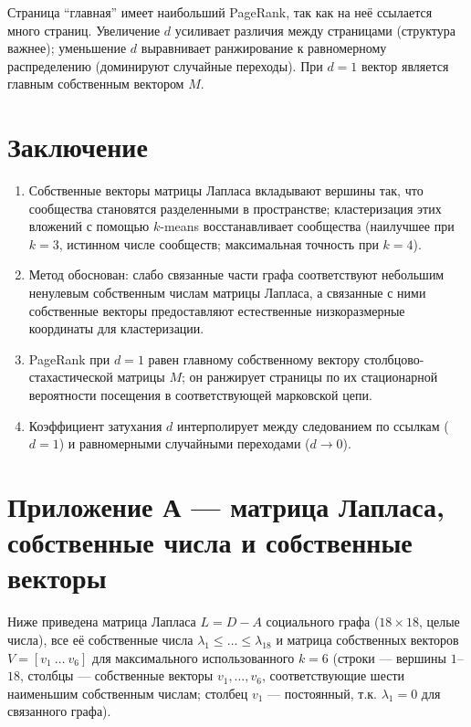 \documentclass[12pt,a4paper]{article}
\begin{document}
Страница ``главная'' имеет наибольший PageRank, так как на неё ссылается много страниц. Увеличение $d$ усиливает различия между страницами (структура важнее); уменьшение $d$ выравнивает ранжирование к равномерному распределению (доминируют случайные переходы). При $d=1$ вектор является главным собственным вектором $M$.

\section{Заключение}
\begin{enumerate}
    \item Собственные векторы матрицы Лапласа вкладывают вершины так, что сообщества становятся разделенными в пространстве; кластеризация этих вложений с помощью $k$-means восстанавливает сообщества (наилучшее при $k=3$, истинном числе сообществ; максимальная точность при $k=4$).
    \item Метод обоснован: слабо связанные части графа соответствуют небольшим ненулевым собственным числам матрицы Лапласа, а связанные с ними собственные векторы предоставляют естественные низкоразмерные координаты для кластеризации.
    \item PageRank при $d=1$ равен главному собственному вектору столбцово-стахастической матрицы $M$; он ранжирует страницы по их стационарной вероятности посещения в соответствующей марковской цепи.
    \item Коэффициент затухания $d$ интерполирует между следованием по ссылкам ($d=1$) и равномерными случайными переходами ($d\to0$).
\end{enumerate}

\appendix

\section{Приложение А --- матрица Лапласа, собственные числа и собственные векторы}

Ниже приведена матрица Лапласа $L=D-A$ социального графа ($18\times18$, целые числа), все её собственные числа $\lambda_1\le\dots\le\lambda_{18}$ и матрица собственных векторов $V=[v_1\ \dots\ v_6]$ для максимального использованного $k=6$ (строки --- вершины $1$--$18$, столбцы --- собственные векторы $v_1,\dots,v_6$, соответствующие шести наименьшим собственным числам; столбец $v_1$ --- постоянный, т.к. $\lambda_1=0$ для связанного графа).
\end{document}

